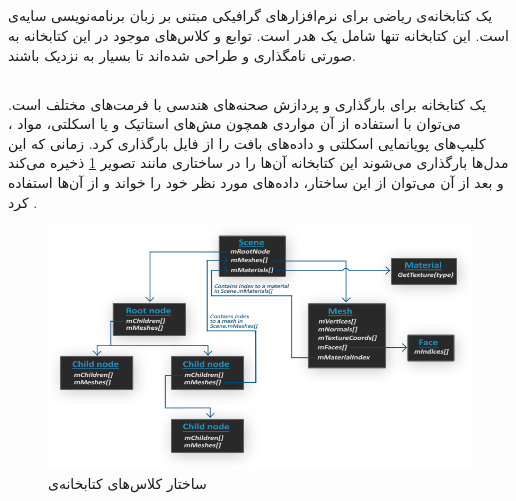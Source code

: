 \subsection{}
یک کتابخانه‌ی ریاضی برای نرم‌افزارهای گرافیکی مبتنی بر زبان برنامه‌نویسی سایه‌ی 
است. این کتابخانه تنها شامل یک هدر 
است.
توابع و کلاس‌های موجود در این کتابخانه به صورتی نامگذاری و طراحی شده‌اند تا بسیار به 
 نزدیک باشند.


 \subsection{}

 یک کتابخانه برای بارگذاری و پردازش صحنه‌های هندسی با فرمت‌های مختلف است.
 می‌توان با استفاده از آن مواردی همچون مش‌های استاتیک و یا اسکلتی، مواد 
 ، کلیپ‌های پویانمایی اسکلتی و داده‌‌های بافت را از فایل بارگذاری کرد.
زمانی که این مدل‌ها بارگذاری می‌شوند این کتابخانه آن‌ها را در ساختاری مانند تصویر
\ref{fig:Assimp}
 ذخیره می‌کند و بعد از آن می‌توان از این ساختار، داده‌های مورد نظر خود را خواند و از آن‌ها استفاده کرد  \cite{Assimp} \cite{LearnOpenGL_Assimp}.

\begin{figure}[ht]
	\centerline{\includegraphics[width=\textwidth,height=\textheight,keepaspectratio]{Figures/Ch5/assimp_structure.png}}

	\caption{ساختار کلاس‌های کتابخانه‌ی  \cite{LearnOpenGL_Assimp}}
	\label{fig:Assimp}
  \end{figure}
  


  
\subsection{}

